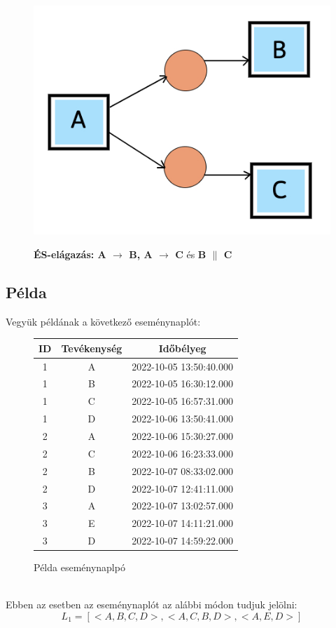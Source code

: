 \begin{figure}[h!]
\begin{center}
\caption{\textbf{ÉS-elágazás: A $\rightarrow$ B, A $\rightarrow$ C} és \textbf{B $\parallel$ C}}
\includegraphics[width=8truecm, height=6truecm]{images/img_alpha_and}\\
\label{fig:example}
\end{center}
\end{figure}

\newpage

\subsection{Példa}
Vegyük példának a következő eseménynaplót:\\
\begin{figure}[h]
\begin{center}
\caption{Példa eseménynaplpó}
\begin{tabular}{||c | c | c ||}
	\hline
	ID & Tevékenység & Időbélyeg \\ [0.5ex]
	\hline\hline
	1 & A & 2022-10-05 13:50:40.000 \\
	\hline
	1 & B & 2022-10-05 16:30:12.000 \\
	\hline
	1 & C & 2022-10-05 16:57:31.000 \\
	\hline
	1 & D & 2022-10-06 13:50:41.000 \\
	\hline
	2 & A & 2022-10-06 15:30:27.000 \\
	\hline
	2 & C & 2022-10-06 16:23:33.000 \\
	\hline
	2 & B & 2022-10-07 08:33:02.000 \\
	\hline
	2 & D & 2022-10-07 12:41:11.000 \\
	\hline
	3 & A & 2022-10-07 13:02:57.000 \\
	\hline
	3 & E & 2022-10-07 14:11:21.000 \\
	\hline
	3 & D & 2022-10-07 14:59:22.000 \\
	\hline
\end{tabular}
\label{fig:example}
\end{center}
\end{figure}\\	
Ebben az esetben az eseménynaplót az alábbi módon tudjuk jelölni:
\[ 
	L_1 = [< A,B,C,D >, <A,C,B,D>, <A,E,D>]
\]

